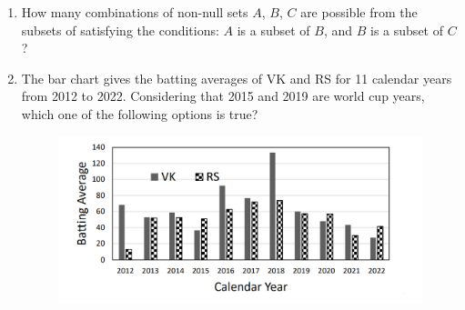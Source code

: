 \documentclass[journal]{IEEEtran}
\begin{document}
\begin{enumerate}[leftmargin=0pt]
\vspace{2mm}

\begin{enumerate}
\end{enumerate}

\hfill{}

\vspace{4mm}

\item
How many combinations of non-null sets $A$, $B$, $C$ are possible from the subsets of  satisfying the conditions:  $A$ is a subset of $B$, and  $B$ is a subset of $C$?

\vspace{2mm}

\begin{enumerate}
\end{enumerate}

\hfill{}

\vspace{4mm}

\item
The bar chart gives the batting averages of VK and RS for 11 calendar years from 2012 to 2022. Considering that 2015 and 2019 are world cup years, which one of the following options is true?
\begin{figure}[h]
\centering
\includegraphics[width=0.5\columnwidth]{Figs/image (60).png}
\caption*{}
\label{fig:8}
\end{figure}


\end{enumerate}
\end{document}
